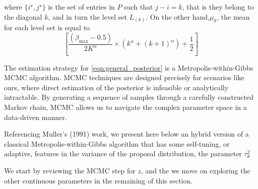 \documentclass[11pt]{amsart}
\begin{document}
 
 where $\{i^\star, j^\star\}$ is the set of entries in $P$ such that $ j-i=k $, that is they belong to the diagonal $k$, and in turn the level set $L_{(k)}$. On the other hand,$\mu_k$, the mean for each level set is equal to 
 \[ \left[ \frac{(\beta_{\max} - 0.5)}{2K^{\alpha}} \times  \left(  k^{\alpha} + (k+1)^{\alpha} \right) +\frac{1}{2} \right]
 \]
 
The estimation strategy for \eqref{eqn:general_posterior} is a Metropolis-within-Gibbs MCMC algorithm. MCMC techniques are designed precisely for scenarios like ours, where direct estimation of the posterior is infeasible or analytically intractable. By generating a sequence of samples through a carefully constructed Markov chain, MCMC allows us to navigate the complex parameter space in a data-driven manner.

Referencing Muller's (1991) work, we present here below an hybrid version of a classical Metropolis-within-Gibbs algorithm that has some self-tuning, or adaptive, features in the variance of the proposal distribution, the parameter $\tau^2_{\theta}$

We start by reviewing the MCMC step for $z$, and the we move on exploring the other continuous parameters in the remaining of this section.
\end{document}
